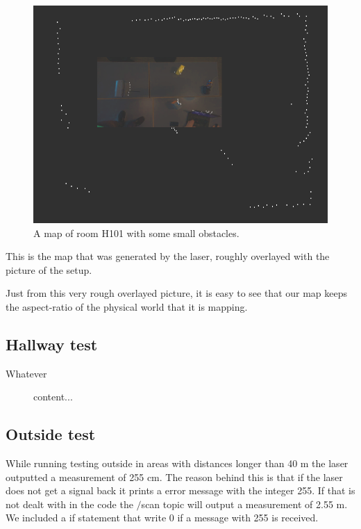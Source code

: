 \begin{figure}[H]
	\centering
	\includegraphics[scale=.4]{images/h101_obstacles_overlay.png}
	\caption{A map of room H101 with some small obstacles.}
	\label{fig:internallidar}
\end{figure}
	
This is the map that was generated by the laser, roughly overlayed with the picture of the setup.

Just from this very rough overlayed picture, it is easy to see that our map keeps the aspect-ratio of the physical world that it is mapping. 


\subsection{Hallway test}

Whatever

\begin{figure}[H]
	content...
\end{figure}

\subsection{Outside test}
While running testing outside in areas with distances longer than 40 m the laser outputted a measurement of 255 cm. The reason behind this is that if the laser does not get a signal back it prints a error message with the integer 255. If that is not dealt with in the code the $/$scan topic will output a measurement of 2.55 m. We included a if statement that write 0 if a message with 255 is received. 

